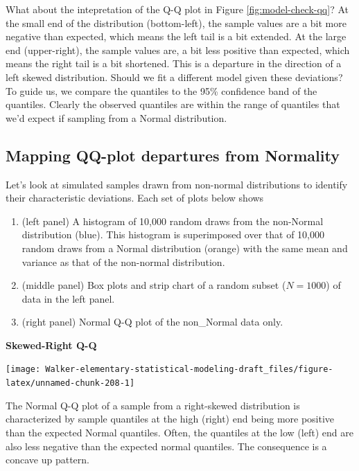 \documentclass[]{book}
\providecommand{\tightlist}{%
  \setlength{\itemsep}{0pt}\setlength{\parskip}{0pt}}
\begin{document}
What about the intepretation of the Q-Q plot in Figure \ref{fig:model-check-qq}? At the small end of the distribution (bottom-left), the sample values are a bit more negative than expected, which means the left tail is a bit extended. At the large end (upper-right), the sample values are, a bit less positive than expected, which means the right tail is a bit shortened. This is a departure in the direction of a left skewed distribution. Should we fit a different model given these deviations? To guide us, we compare the quantiles to the 95\% confidence band of the quantiles. Clearly the observed quantiles are within the range of quantiles that we'd expect if sampling from a Normal distribution.

\hypertarget{mapping-qq-plot-departures-from-normality}{%
\subsection{Mapping QQ-plot departures from Normality}\label{mapping-qq-plot-departures-from-normality}}

Let's look at simulated samples drawn from non-normal distributions to identify their characteristic deviations. Each set of plots below shows

\begin{enumerate}
\def\labelenumi{\arabic{enumi}.}
\tightlist
\item
  (left panel) A histogram of 10,000 random draws from the non-Normal distribution (blue). This histogram is superimposed over that of 10,000 random draws from a Normal distribution (orange) with the same mean and variance as that of the non-normal distribution.
\item
  (middle panel) Box plots and strip chart of a random subset (\(N=1000\)) of data in the left panel.
\item
  (right panel) Normal Q-Q plot of the non\_Normal data only.
\end{enumerate}

\textbf{Skewed-Right Q-Q}

\texttt{[image: Walker-elementary-statistical-modeling-draft\_files/figure-latex/unnamed-chunk-208-1]}

The Normal Q-Q plot of a sample from a right-skewed distribution is characterized by sample quantiles at the high (right) end being more positive than the expected Normal quantiles. Often, the quantiles at the low (left) end are also less negative than the expected normal quantiles. The consequence is a concave up pattern.
\end{document}
